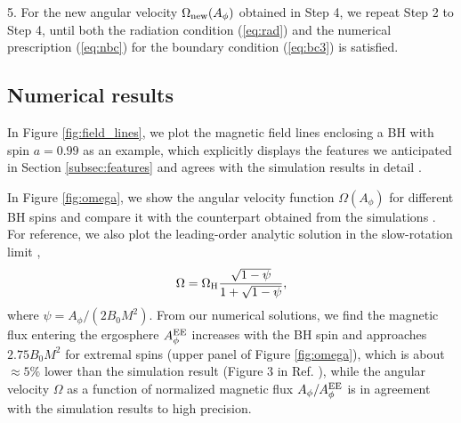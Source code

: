 \documentclass[aps,prd,reprint,nofootinbib, superscriptaddress]{revtex4-1}
\def\Ap{A_\phi}
\def\be{\begin{equation}}
\def\ee{\end{equation}}
\def\WH{\Omega_{\rm H}}
\def\AEE{A_\phi^{\rm EE}}
\begin{document}
 5. For the new angular velocity $\Omega_{\rm new}(\Ap)$ obtained in Step 4, we repeat Step 2 to Step 4,
 until both the radiation condition (\ref{eq:rad}) and the numerical prescription (\ref{eq:nbc}) for the boundary condition (\ref{eq:bc3}) is satisfied.

\subsection{Numerical results}

In Figure \ref{fig:field_lines}, we plot the magnetic field lines enclosing a BH with spin $a =0.99$ as an example,
which explicitly displays the features we anticipated in Section \ref{subsec:features} and agrees with
the simulation results in detail \cite{East2018}.

In Figure \ref{fig:omega}, we show the angular velocity function $\Omega(A_\phi)$ for different BH spins and
compare it with the counterpart obtained from the simulations \cite{East2018}.
For reference, we also plot the leading-order analytic solution in the slow-rotation
limit \cite{Beskin2013, Pan2014, Gralla2015, East2018},
\be
    \Omega = \WH\frac{\sqrt{1-\psi}} {1+\sqrt{1-\psi}},
\ee
where $\psi = \Ap/(2B_0M^2)$.
From our numerical solutions, we find the magnetic flux entering the ergosphere $\AEE$ increases with
the BH spin and approaches $2.75 B_0 M^2$ for extremal spins (upper panel of Figure \ref{fig:omega}),
which is about $\approx 5\%$ lower than the simulation result (Figure 3 in Ref. \cite{East2018}),
while the angular velocity $\Omega$ as a function
of normalized magnetic flux $\Ap/\AEE$ is in agreement with the simulation results to high precision.
\end{document}
